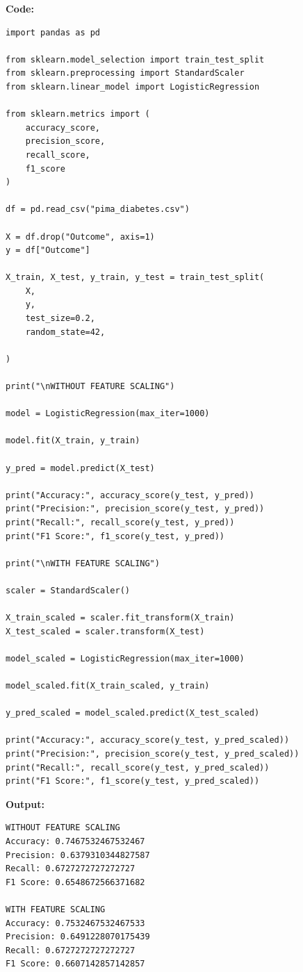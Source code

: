 \documentclass[12pt, a4paper]{article}
\begin{document}
\vspace{\baselineskip}
\noindent \textbf{Code:}\\
\begin{lstlisting}
import pandas as pd

from sklearn.model_selection import train_test_split
from sklearn.preprocessing import StandardScaler
from sklearn.linear_model import LogisticRegression

from sklearn.metrics import (
    accuracy_score,
    precision_score,
    recall_score,
    f1_score
)

df = pd.read_csv("pima_diabetes.csv")

X = df.drop("Outcome", axis=1)
y = df["Outcome"]

X_train, X_test, y_train, y_test = train_test_split(
    X,
    y,
    test_size=0.2,
    random_state=42,

)

print("\nWITHOUT FEATURE SCALING")

model = LogisticRegression(max_iter=1000)

model.fit(X_train, y_train)

y_pred = model.predict(X_test)

print("Accuracy:", accuracy_score(y_test, y_pred))
print("Precision:", precision_score(y_test, y_pred))
print("Recall:", recall_score(y_test, y_pred))
print("F1 Score:", f1_score(y_test, y_pred))

print("\nWITH FEATURE SCALING")

scaler = StandardScaler()

X_train_scaled = scaler.fit_transform(X_train)
X_test_scaled = scaler.transform(X_test)

model_scaled = LogisticRegression(max_iter=1000)

model_scaled.fit(X_train_scaled, y_train)

y_pred_scaled = model_scaled.predict(X_test_scaled)

print("Accuracy:", accuracy_score(y_test, y_pred_scaled))
print("Precision:", precision_score(y_test, y_pred_scaled))
print("Recall:", recall_score(y_test, y_pred_scaled))
print("F1 Score:", f1_score(y_test, y_pred_scaled))
\end{lstlisting}

\vspace{\baselineskip}

\noindent \textbf{Output:}\\
\begin{lstlisting}[style=terminal]
WITHOUT FEATURE SCALING
Accuracy: 0.7467532467532467
Precision: 0.6379310344827587
Recall: 0.6727272727272727
F1 Score: 0.6548672566371682

WITH FEATURE SCALING
Accuracy: 0.7532467532467533
Precision: 0.6491228070175439
Recall: 0.6727272727272727
F1 Score: 0.6607142857142857
\end{lstlisting}
\end{document}
